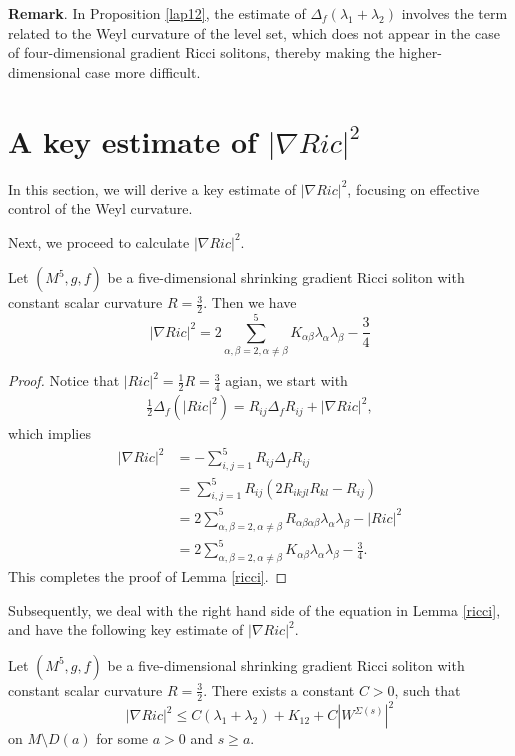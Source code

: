\documentclass[12pt]{amsart}
\newcommand{\ban}{\begin{eqnarray*}}
\newcommand{\ean}{\end{eqnarray*}}
\begin{document}
	\textbf{Remark}. In Proposition \ref{lap12}, the estimate of $\Delta_f(\lambda_1+\lambda_2)$ involves the term related to the Weyl curvature of the level set, which does not appear in the case of four-dimensional gradient Ricci solitons, thereby making the higher-dimensional case more difficult.
	
	
	\section{A key estimate of $|\nabla Ric|^2$}\label{sec4}
	In this section, we will derive a key estimate of $|\nabla Ric|^2$,
	focusing on effective control of the Weyl curvature.
	\smallskip
	
	Next, we proceed to calculate $|\nabla Ric|^2$.
	\begin{lem}\label{ricci}
		Let $(M^5, g, f)$ be a five-dimensional shrinking gradient Ricci soliton with constant scalar curvature $R=\frac{3}{2}$. Then we have
		\begin{equation*}
		|\nabla Ric|^2=2\sum_{\alpha,\beta=2,\alpha\neq\beta}^5 K_{\alpha\beta}\lambda_{\alpha}\lambda_{\beta}- \frac{3}{4}
		\end{equation*}	
	\end{lem}
	\begin{proof}
		Notice that $|Ric|^2=\frac{1}{2}R=\frac{3}{4}$ agian, we start with
		\ban
		\frac{1}{2}\Delta_f(|Ric|^2)=R_{ij}\Delta_fR_{ij}+|\nabla Ric|^2,
		\ean
		which implies
		\begin{equation*}
		\begin{aligned}
		|\nabla Ric|^2&=-\sum_{i,j=1}^5R_{ij}\Delta_fR_{ij}\\
		&=\sum_{i,j=1}^5R_{ij}(2R_{ikjl}R_{kl}-R_{ij})\\
		&=2\sum_{\alpha,\beta=2,\alpha\neq\beta}^5R_{\alpha\beta\alpha\beta}\lambda_\alpha\lambda_\beta-|Ric|^2\\
		&=2\sum_{\alpha,\beta=2,\alpha\neq\beta}^5K_{\alpha\beta}\lambda_{\alpha}\lambda_{\beta}- \frac{3}{4}.
		\end{aligned}
		\end{equation*}
		This completes the proof of Lemma \ref{ricci}.
	\end{proof}
	
	Subsequently, we deal with the right hand side of the equation in Lemma \ref{ricci}, and have the following key estimate of $|\nabla Ric|^2$.
	
	\begin{prop}\label{key}
		Let $(M^5, g, f)$ be a five-dimensional shrinking gradient Ricci soliton with constant scalar curvature $R=\frac{3}{2}$. There exists a constant $C>0$, such that
		\[
		|\nabla Ric|^2\leq C(\lambda_1+\lambda_2)+K_{12}+C|W^{\Sigma(s)}|^2	
		\]
		on $M\setminus D(a)$ for some $a>0$ and $s\geq a$.
	\end{prop}	
	
\end{document}
